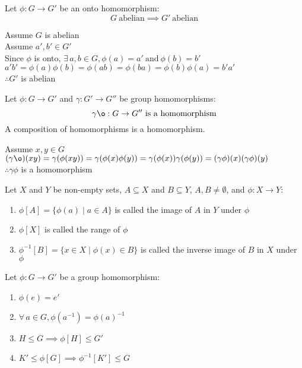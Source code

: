 \documentclass[letterpaper,12pt,fleqn]{article}
\newcommand{\p}{\phi}
\newcommand{\g}{\gamma}
\begin{document}
\begin{theorem}
  Let $\p:G\to G'$ be an onto homomorphism:
  \[G\ \mbox{abelian}\implies G'\ \mbox{abelian}\]
\end{theorem}

\begin{theproof}
  Assume $G$ is abelian \\
  Assume $a',b'\in G'$ \\
  Since $\p$ is onto, $\exists\,a,b\in G,\p(a)=a'\ \mbox{and}\ \p(b)=b'$ \\
  $a'b'=\p(a)\p(b)=\p(ab)=\p(ba)=\p(b)\p(a)=b'a'$ \\
  $\therefore G'$ is abelian
\end{theproof}

\begin{theorem}
  Let $\p:G\to G'$ and $\g:G'\to G''$ be group homomorphisms:
  \[\g\o:G\to G''\ \mbox{is a homomorphism}\]
  A composition of homomorphisms is a homomorphism.
\end{theorem}

\begin{theproof}
  Assume $x,y\in G$ \\
  $(\g\o)(xy)=\g(\p(xy))=\g(\p(x)\p(y))=
  \g(\p(x))\g(\p(y))=(\g\p)(x)(\g\p)(y)$ \\
  $\therefore \g\p$ is a homomorphism
\end{theproof}

\begin{definition}
  Let $X$ and $Y$ be non-empty sets, $A\subseteq X$ and $B\subseteq Y$,
  $A,B\ne\emptyset$, and $\p:X\to Y$:
  \begin{enumerate}
  \item $\p[A]=\{\p(a)\mid a\in A\}$ is called the image of $A$ in $Y$
    under $\p$
  \item $\p[X]$ is called the range of $\p$
  \item $\p^{-1}[B]=\{x\in X\mid \p(x)\in B\}$ is called the inverse image of
    $B$ in $X$ under $\p$
  \end{enumerate}
\end{definition}
\newpage
\begin{theorem}
  Let $\p:G\to G'$ be a group homomorphism:
  \begin{enumerate}
  \item $\p(e)=e'$
  \item $\forall\,a\in G,\p(a^{-1})=\p(a)^{-1}$
  \item $H\le G\implies \p[H]\le G'$
  \item $K'\le\p[G]\implies\p^{-1}[K']\le G$
  \end{enumerate}
\end{theorem}
\end{document}

